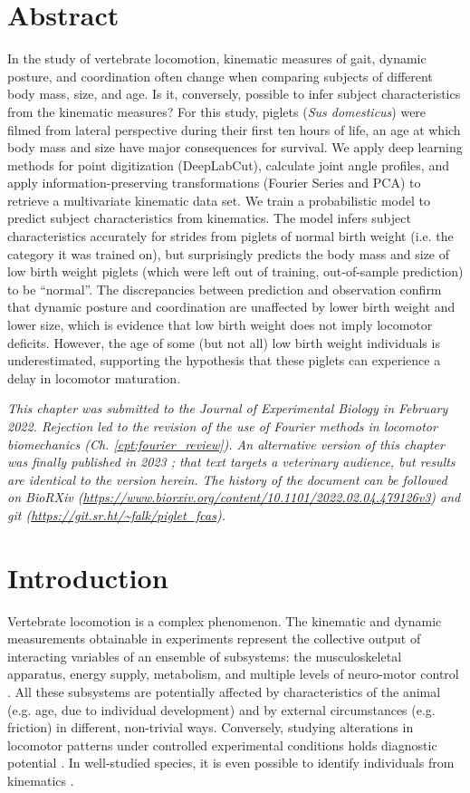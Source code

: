 \clearpage
\section{Abstract}
\label{abstract_22}
In the study of vertebrate locomotion, kinematic measures of gait, dynamic posture, and coordination often change when comparing subjects of different body mass, size, and age.
Is it, conversely, possible to infer subject characteristics from the kinematic measures?
For this study, piglets (\textit{Sus domesticus}) were filmed from lateral perspective during their first ten hours of life, an age at which body mass and size have major consequences for survival.
We apply deep learning methods for point digitization (DeepLabCut), calculate joint angle profiles, and apply information-preserving transformations (Fourier Series and PCA) to retrieve a multivariate kinematic data set.
We train a probabilistic model to predict subject characteristics from kinematics.
The model infers subject characteristics accurately for strides from piglets of normal birth weight (i.e. the category it was trained on), but surprisingly predicts the body mass and size of low birth weight piglets (which were left out of training, out-of-sample prediction) to be ``normal''.
The discrepancies between prediction and observation confirm that dynamic posture and coordination are unaffected by lower birth weight and lower size, which is evidence that low birth weight does not imply locomotor deficits.
However, the age of some (but not all) low birth weight individuals is underestimated, supporting the hypothesis that these piglets can experience a delay in locomotor maturation.

\textit{This chapter was submitted to the Journal of Experimental Biology in February 2022. Rejection led to the revision of the use of Fourier methods in locomotor biomechanics (Ch. \ref{cpt:fourier_review}). An alternative version of this chapter was finally published in 2023 \citep{Mielke2023}; that text targets a veterinary audience, but results are identical to the version herein. The history of the document can be followed on BioRXiv (\url{https://www.biorxiv.org/content/10.1101/2022.02.04.479126v3}) and git (\url{https://git.sr.ht/~falk/piglet_fcas}). }


\FloatBarrier
\clearpage
\section{Introduction}
\label{intro_22}
Vertebrate locomotion is a complex phenomenon.
The kinematic and dynamic measurements obtainable in experiments represent the collective output of interacting variables of an ensemble of subsystems:
the musculoskeletal apparatus, energy supply, metabolism, and multiple levels of neuro-motor control \citep{Nishikawa2007}.
All these subsystems are potentially affected by characteristics of the animal (e.g. age, due to individual development) and by external circumstances (e.g. friction) in different, non-trivial ways.
Conversely, studying alterations in locomotor patterns under controlled experimental conditions holds diagnostic potential \citep[e.g.][]{Figueiredo2018}.
In well-studied species, it is even possible to identify individuals from kinematics \citep[e.g.][]{Patua2021}.


